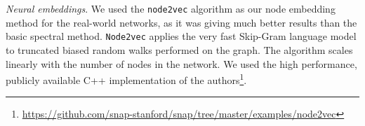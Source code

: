\documentclass[runningheads]{llncs}
\begin{document}
\begin{table*}[h]
\begin{center}
\captionsetup{justification=centering, size=small}
\caption{\label{tab:stats} Statistics of the social network datasets (first 5 columns) and the bioinformatics dataset used in our experiments.}
\end{center}
\end{table*}

\vspace{-1cm}

\textit{Neural embeddings}.
We used the \texttt{node2vec} algorithm \cite{grover2016node2vec} as our node embedding method for the real-world networks, as it was giving much better results than the basic spectral method. \texttt{Node2vec} applies the very fast Skip-Gram language model \cite{mikolov2013efficient} to truncated biased random walks performed on the graph. The algorithm scales linearly with the number of nodes in the network. We used the high performance, publicly available C++ implementation of the authors\footnote{\scriptsize{\url{https://github.com/snap-stanford/snap/tree/master/examples/node2vec}}}.
\end{document}
